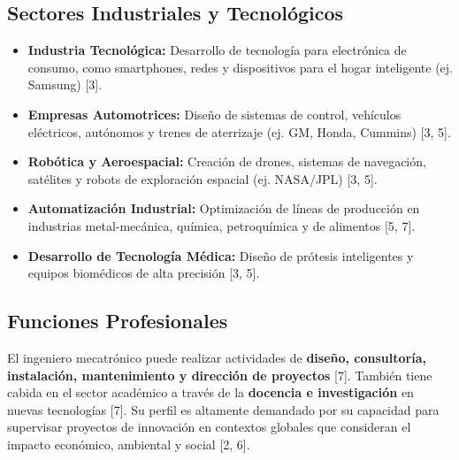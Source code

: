 \documentclass[12pt]{article}
\begin{document}
\subsection{Sectores Industriales y Tecnológicos}
\begin{itemize}
    \item \textbf{Industria Tecnológica:} Desarrollo de tecnología para electrónica de consumo, como smartphones, redes y dispositivos para el hogar inteligente (ej. Samsung) [3].
    \item \textbf{Empresas Automotrices:} Diseño de sistemas de control, vehículos eléctricos, autónomos y trenes de aterrizaje (ej. GM, Honda, Cummins) [3, 5].
    \item \textbf{Robótica y Aeroespacial:} Creación de drones, sistemas de navegación, satélites y robots de exploración espacial (ej. NASA/JPL) [3, 5].
    \item \textbf{Automatización Industrial:} Optimización de líneas de producción en industrias metal-mecánica, química, petroquímica y de alimentos [5, 7].
    \item \textbf{Desarrollo de Tecnología Médica:} Diseño de prótesis inteligentes y equipos biomédicos de alta precisión [3, 5].
\end{itemize}

\subsection{Funciones Profesionales}
El ingeniero mecatrónico puede realizar actividades de \textbf{diseño, consultoría, instalación, mantenimiento y dirección de proyectos} [7]. También tiene cabida en el sector académico a través de la \textbf{docencia e investigación} en nuevas tecnologías [7]. Su perfil es altamente demandado por su capacidad para supervisar proyectos de innovación en contextos globales que consideran el impacto económico, ambiental y social [2, 6].
\end{document}

